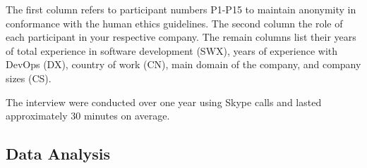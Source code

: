 The first column refers to participant numbers P1-P15 to maintain anonymity in
conformance with the human ethics guidelines. The second column the role of
each participant in your respective company. The remain columns list their
years of total experience in software development (SWX), years of experience
with DevOps (DX), country of work (CN), main domain of the company, and company
sizes (CS).

The interview were conducted over one year using Skype calls and lasted
approximately 30 minutes on average.




\subsection{Data Analysis}
